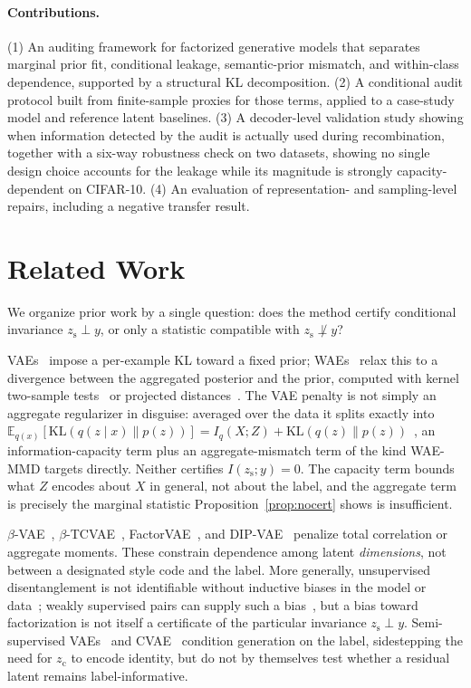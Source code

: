 \documentclass[letterpaper]{article} %
\newcommand{\zc}{z_{\mathrm{c}}}
\newcommand{\zs}{z_{\mathrm{s}}}
\newcommand{\KL}{\mathrm{KL}}
\begin{document}
\paragraph{Contributions.}
(1) An auditing framework for factorized generative models that separates
marginal prior fit, conditional leakage, semantic-prior mismatch, and
within-class dependence, supported by a structural KL decomposition. (2) A
conditional audit protocol built from finite-sample proxies for those terms,
applied to a case-study model and reference latent baselines. (3) A
decoder-level validation study showing when information detected by the audit
is actually used during recombination, together with a
six-way robustness check on two datasets, showing no single design choice
accounts for the leakage while its magnitude is strongly capacity-dependent
on CIFAR-10. (4) An evaluation of representation- and sampling-level
repairs, including a negative transfer result.

\section{Related Work}

We organize prior work by a single question: does the method certify
conditional invariance $\zs\perp y$, or only a statistic compatible with
$\zs\not\perp y$?

VAEs~\citep{kingma2013autoencoding} impose a per-example KL toward a fixed
prior; WAEs~\citep{tolstikhin2017wasserstein} relax this to a divergence
between the aggregated posterior and the prior, computed with kernel
two-sample tests~\citep{gretton2012kernel} or projected
distances~\citep{kolouri2018sliced}. The VAE penalty is not simply an
aggregate regularizer in disguise: averaged over the data it splits exactly
into $\mathbb E_{q(x)}[\KL(q(z\mid x)\|p(z))] = I_q(X;Z) +
\KL(q(z)\|p(z))$~\citep{hoffman2016elbo}, an information-capacity term plus
an aggregate-mismatch term of the kind WAE-MMD targets directly. Neither
certifies $I(\zs;y)=0$. The capacity term bounds what $Z$ encodes about $X$
in general, not about the label, and the aggregate term is precisely the
marginal statistic Proposition~\ref{prop:nocert} shows is insufficient.

$\beta$-VAE~\citep{higgins2017beta}, $\beta$-TCVAE~\citep{chen2018isolating},
FactorVAE~\citep{kim2018disentangling}, and DIP-VAE~\citep{kumar2018dipvae}
penalize total correlation or aggregate moments. These constrain dependence
among latent \emph{dimensions}, not between a designated style code and the
label. More generally, unsupervised disentanglement is not identifiable
without inductive biases in the model or data~\citep{locatello2019challenging};
weakly supervised pairs can supply such a bias~\citep{locatello2020weakly},
but a bias toward factorization is not itself a certificate of the particular
invariance $\zs\perp y$. Semi-supervised VAEs~\citep{kingma2014semi} and
CVAE~\citep{sohn2015learning} condition generation on the label, sidestepping
the need for $\zc$ to encode identity, but do not by themselves test whether
a residual latent remains label-informative.
\end{document}
